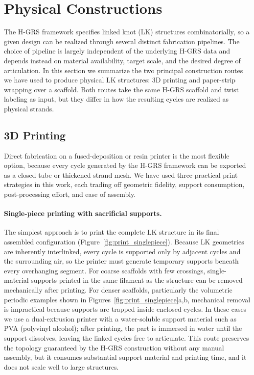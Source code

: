 \documentclass[acmtog]{acmart}
\begin{document}
\section{Physical Constructions}
\label{sec:physical_construction}

The H-GRS framework specifies linked knot (LK) structures
combinatorially, so a given design can be realized through several
distinct fabrication pipelines. The choice of pipeline is largely
independent of the underlying H-GRS data and depends instead on
material availability, target scale, and the desired degree of
articulation. In this section we summarize the two principal
construction routes we have used to produce physical LK structures:
3D printing and paper-strip wrapping over a scaffold. Both routes
take the same H-GRS scaffold and twist labeling as input, but they
differ in how the resulting cycles are realized as physical strands.

\subsection{3D Printing}

Direct fabrication on a fused-deposition or resin printer is the
most flexible option, because every cycle generated by the H-GRS
framework can be exported as a closed tube or thickened strand mesh.
We have used three practical print strategies in this work, each
trading off geometric fidelity, support consumption, post-processing
effort, and ease of assembly.

\paragraph{Single-piece printing with sacrificial supports.}
The simplest approach is to print the complete LK structure in its
final assembled configuration (Figure~\ref{fig:print_singlepiece}).
Because LK geometries are inherently interlinked, every cycle is
supported only by adjacent cycles and the surrounding air, so the
printer must generate temporary supports beneath every overhanging
segment. For coarse scaffolds with few crossings, single-material
supports printed in the same filament as the structure can be removed
mechanically after printing. For denser scaffolds, particularly the
volumetric periodic examples shown in
Figures~\ref{fig:print_singlepiece}a,b, mechanical removal is
impractical because supports are trapped inside enclosed cycles.
In these cases we use a dual-extrusion printer with a water-soluble
support material such as PVA (polyvinyl alcohol); after printing,
the part is immersed in water until the support dissolves, leaving
the linked cycles free to articulate. This route preserves the
topology guaranteed by the H-GRS construction without any manual
assembly, but it consumes substantial support material and printing
time, and it does not scale well to large structures.
\end{document}
